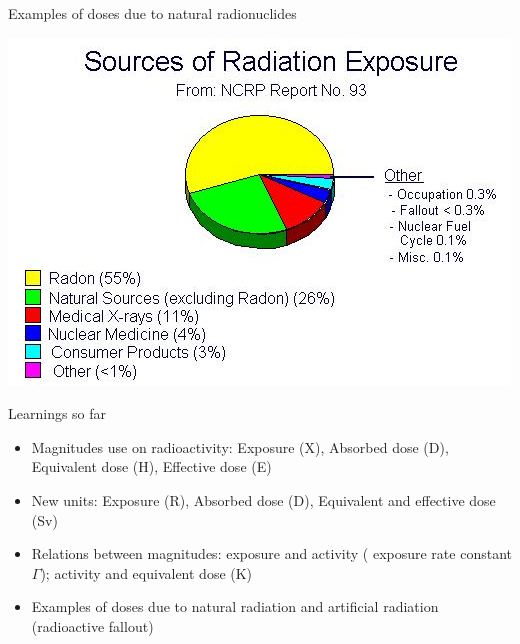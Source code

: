 \begin{frame}{Examples of doses due to natural radionuclides}

\centering
\includegraphics[scale=0.5]{figures/dosespopulation}

\end{frame}

\begin{frame}{Learnings so far}

\begin{alertblock}{}

\begin{itemize}

\pause \item Magnitudes use on radioactivity: Exposure (X), Absorbed dose (D), Equivalent dose (H), Effective dose (E)

\pause \item New units: Exposure (R), Absorbed dose (D), Equivalent and effective dose (Sv)

\pause \item Relations between magnitudes: exposure and activity ( exposure rate constant $\Gamma$); activity and equivalent dose (K)

\pause \item Examples of doses due to natural radiation and artificial radiation (radioactive fallout)

\end{itemize}

\end{alertblock}

\end{frame}